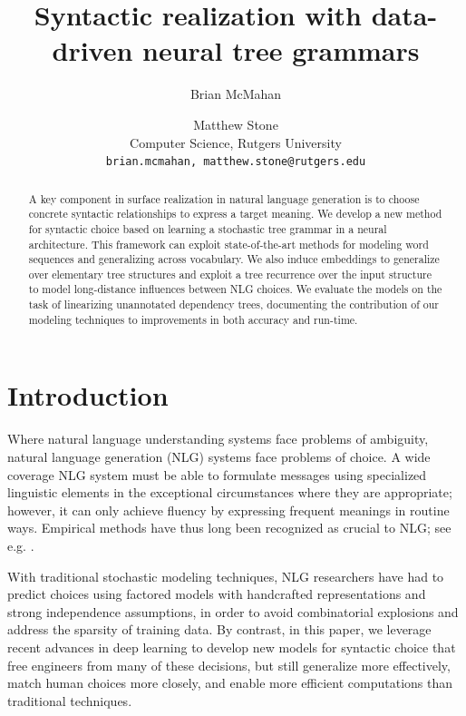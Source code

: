 \documentclass[11pt]{article}
\title{Syntactic realization with data-driven neural tree grammars}
\author{Brian McMahan \and Matthew Stone \\
   Computer Science, Rutgers University \\
   {\tt brian.mcmahan, matthew.stone@rutgers.edu}}
\date{}
\begin{document}
\maketitle
\begin{abstract}

A key component in surface realization in natural language generation
is to choose concrete syntactic relationships to express a target
meaning.
%
We develop a new method for syntactic choice based on learning a
stochastic tree grammar in a neural architecture.
%
This framework can exploit state-of-the-art methods for modeling word
sequences and generalizing across vocabulary.
%
We also induce embeddings to generalize over elementary tree
structures and exploit a tree recurrence over the input structure to
model long-distance influences between NLG choices.
%
We evaluate the models on the task of linearizing unannotated
dependency trees, documenting the contribution of our modeling
techniques to improvements in both accuracy and run-time.

\end{abstract}

\section{Introduction}

Where natural language understanding systems face problems of
ambiguity, natural language generation (NLG) systems face problems of
choice. A wide coverage NLG system must be able to formulate messages
using specialized linguistic elements in the exceptional circumstances
where they are appropriate; however, it can only achieve fluency by
expressing frequent meanings in routine ways. Empirical methods have
thus long been recognized as crucial to NLG; see
e.g. .

With traditional stochastic modeling techniques, NLG researchers have
had to predict choices using factored models with handcrafted
representations and strong independence assumptions, in order to avoid
combinatorial explosions and address the sparsity of training data.
%
By contrast, in this paper, we leverage recent advances in deep
learning to develop new models for syntactic choice that free
engineers from many of these decisions, but still generalize more
effectively, match human choices more closely, and enable more
efficient computations than traditional techniques.
\end{document}
